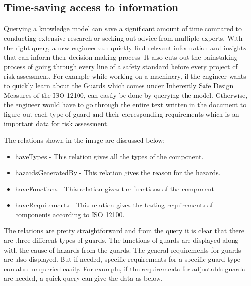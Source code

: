 \subsection{Time-saving access to information}

\paragraph{} Querying a knowledge model can save a significant amount of time compared to conducting extensive research or seeking out advice from multiple experts. With the right query, a new engineer can quickly find relevant information and insights that can inform their decision-making process. It also cuts out the painstaking process of going through every line of a safety standard before every project of risk assessment. For example while working on a machinery, if the engineer wants to quickly learn about the Guards which comes under Inherently Safe Design Measures of the ISO 12100, can easily be done by querying the model. Otherwise, the engineer would have to go through the entire text written in the document to figure out each type of guard and their corresponding requirements which is an important data for risk assessment.


\bigskip\bigskip {}

The relations shown in the image are discussed below:

\begin{itemize}
    \item haveTypes - This relation gives all the types of the component.
    \item hazardsGeneratedBy - This relation gives the reason for the hazards.
    \item haveFunctions - This relation gives the functions of the component.
    \item haveRequirements - This relation gives the testing requirements of components according to ISO 12100.
\end{itemize}

The relations are pretty straightforward and from the query it is clear that there are three different types of guards. The functions of guards are displayed along with the cause of hazards from the guards. The general requirements for guards are also displayed. But if needed, specific requirements for a specific guard type can also be queried easily. For example, if the requirements for adjustable guards are needed, a quick query can give the data as below.

